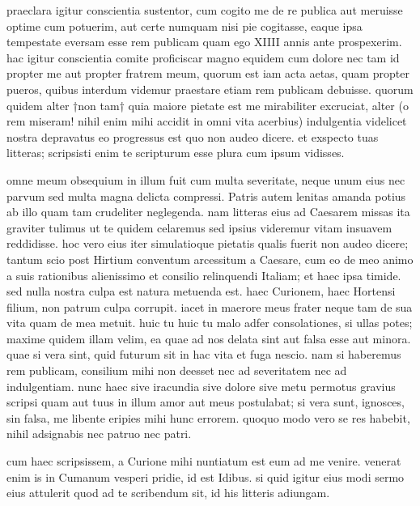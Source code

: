  praeclara igitur conscientia sustentor, cum cogito me de re publica aut meruisse optime cum potuerim, aut certe numquam nisi pie cogitasse, eaque ipsa tempestate eversam esse rem publicam quam ego XIIII annis ante prospexerim. hac igitur conscientia comite proficiscar magno equidem cum dolore nec tam id propter me aut propter fratrem meum, quorum est iam acta aetas, quam propter pueros, quibus interdum videmur praestare etiam rem publicam debuisse. quorum quidem alter †non tam† quia maiore pietate est me mirabiliter excruciat, alter (o rem miseram! nihil enim mihi accidit in omni vita acerbius) indulgentia videlicet nostra depravatus eo progressus est quo non audeo dicere. et exspecto tuas litteras; scripsisti enim te scripturum esse plura cum ipsum vidisses.

 omne meum obsequium in illum fuit cum multa severitate, neque unum eius nec parvum sed multa magna delicta compressi. Patris autem lenitas amanda potius ab illo quam tam crudeliter neglegenda. nam litteras eius ad Caesarem missas ita graviter tulimus ut te quidem celaremus sed ipsius videremur vitam insuavem reddidisse. hoc vero eius iter simulatioque pietatis qualis fuerit non audeo dicere; tantum scio post Hirtium conventum arcessitum a Caesare, cum eo de meo animo a suis rationibus alienissimo et consilio relinquendi Italiam; et haec ipsa timide. sed nulla nostra culpa est natura metuenda est. haec Curionem, haec Hortensi filium, non patrum culpa corrupit. iacet in maerore meus frater neque tam de sua vita quam de mea metuit. huic tu huic tu malo adfer consolationes, si ullas potes; maxime quidem illam velim, ea quae ad nos delata sint aut falsa esse aut minora. quae si vera sint, quid futurum sit in hac vita et fuga nescio. nam si haberemus rem publicam, consilium mihi non deesset nec ad severitatem nec ad indulgentiam. nunc haec sive iracundia sive dolore sive metu permotus gravius scripsi quam aut tuus in illum amor aut meus postulabat; si vera sunt, ignosces, sin falsa, me libente eripies mihi hunc errorem. quoquo modo vero se res habebit, nihil adsignabis nec patruo nec patri.

 cum haec scripsissem, a Curione mihi nuntiatum est eum ad me venire. venerat enim is in Cumanum vesperi pridie, id est Idibus. si quid igitur eius modi sermo eius attulerit quod ad te scribendum sit, id his litteris adiungam.

